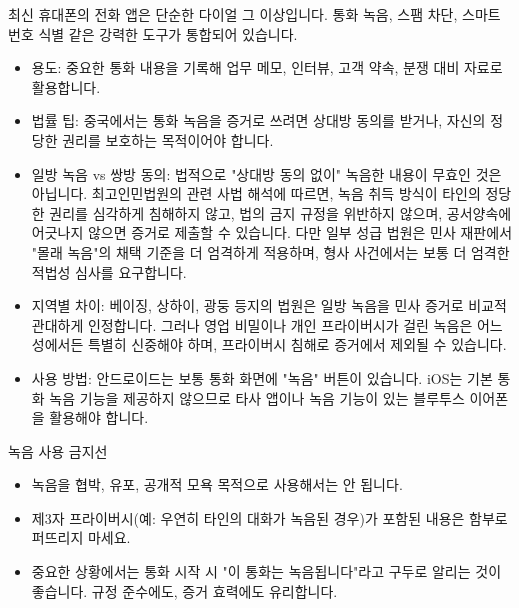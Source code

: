 


최신 휴대폰의 전화 앱은 단순한 다이얼 그 이상입니다. 통화 녹음, 스팸 차단, 스마트 번호 식별 같은 강력한 도구가 통합되어 있습니다.


\begin{itemize}
  \item 용도: 중요한 통화 내용을 기록해 업무 메모, 인터뷰, 고객 약속, 분쟁 대비 자료로 활용합니다.
  \item 법률 팁: 중국에서는 통화 녹음을 증거로 쓰려면 상대방 동의를 받거나, 자신의 정당한 권리를 보호하는 목적이어야 합니다.
  \item 일방 녹음 vs 쌍방 동의: 법적으로 "상대방 동의 없이" 녹음한 내용이 무효인 것은 아닙니다. 최고인민법원의 관련 사법 해석에 따르면, 녹음 취득 방식이 타인의 정당한 권리를 심각하게 침해하지 않고, 법의 금지 규정을 위반하지 않으며, 공서양속에 어긋나지 않으면 증거로 제출할 수 있습니다. 다만 일부 성급 법원은 민사 재판에서 "몰래 녹음"의 채택 기준을 더 엄격하게 적용하며, 형사 사건에서는 보통 더 엄격한 적법성 심사를 요구합니다.
  \item 지역별 차이: 베이징, 상하이, 광둥 등지의 법원은 일방 녹음을 민사 증거로 비교적 관대하게 인정합니다. 그러나 영업 비밀이나 개인 프라이버시가 걸린 녹음은 어느 성에서든 특별히 신중해야 하며, 프라이버시 침해로 증거에서 제외될 수 있습니다.
  \item 사용 방법: 안드로이드는 보통 통화 화면에 "녹음" 버튼이 있습니다. iOS는 기본 통화 녹음 기능을 제공하지 않으므로 타사 앱이나 녹음 기능이 있는 블루투스 이어폰을 활용해야 합니다.
\end{itemize}

\begin{tcbwarn}{녹음 사용 금지선}
\begin{itemize}
  \item 녹음을 협박, 유포, 공개적 모욕 목적으로 사용해서는 안 됩니다.
  \item 제3자 프라이버시(예: 우연히 타인의 대화가 녹음된 경우)가 포함된 내용은 함부로 퍼뜨리지 마세요.
  \item 중요한 상황에서는 통화 시작 시 "이 통화는 녹음됩니다"라고 구두로 알리는 것이 좋습니다. 규정 준수에도, 증거 효력에도 유리합니다.
\end{itemize}

\end{tcbwarn}

